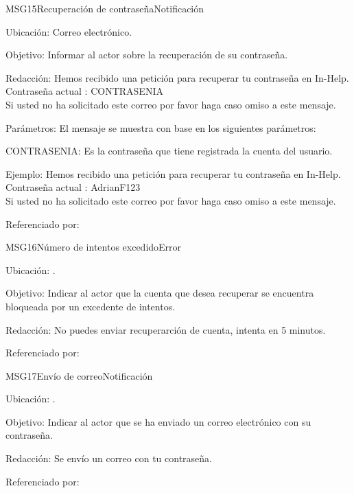 \begin{mensaje}{MSG15}{Recuperación de contraseña}{Notificación}
	\item[Ubicación:] Correo electrónico.
	\item[Objetivo:] Informar al actor sobre la recuperación de su contraseña.
	\item[Redacción:] Hemos recibido una petición para recuperar tu contraseña en In-Help.\\
	Contraseña actual : CONTRASENIA\\
	Si usted no ha solicitado este correo por favor haga caso omiso a este mensaje.
	\item[Parámetros:] El mensaje se muestra con base en los siguientes parámetros:
	\begin{Citemize}
		\item CONTRASENIA: Es la contraseña que tiene registrada la cuenta del usuario.
	\end{Citemize}
	\item[Ejemplo:] Hemos recibido una petición para recuperar tu contraseña en In-Help.\\
	Contraseña actual : AdrianF123\\
	Si usted no ha solicitado este correo por favor haga caso omiso a este mensaje.
	\item[Referenciado por:] 
\end{mensaje}

\begin{mensaje}{MSG16}{Número de intentos excedido}{Error}
	\item[Ubicación:] \msjEmergente.
	\item[Objetivo:] Indicar al actor que la cuenta que desea recuperar se encuentra bloqueada por un excedente de intentos.
	\item[Redacción:] No puedes enviar recuperarción de cuenta, intenta en 5 minutos.
	\item[Referenciado por:] 
\end{mensaje}


\begin{mensaje}{MSG17}{Envío de correo}{Notificación}
	\item[Ubicación:] \msjEmergente.
	\item[Objetivo:] Indicar al actor que se ha enviado un correo electrónico con su contraseña.
	\item[Redacción:] Se envío un correo con tu contraseña.
	\item[Referenciado por:] 
\end{mensaje}

